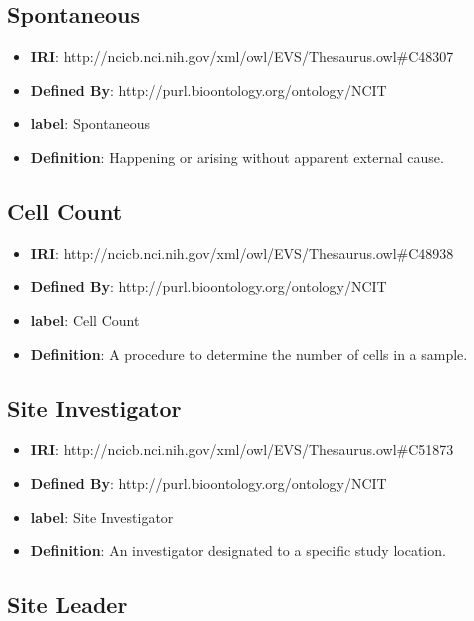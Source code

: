 \documentclass[a4paper,12pt,oneside]{article}
\begin{document}
  \subsection{Spontaneous}

  \begin{itemize}
     \item \textbf{IRI}: http://ncicb.nci.nih.gov/xml/owl/EVS/Thesaurus.owl\#C48307
     \item \textbf{Defined By}: http://purl.bioontology.org/ontology/NCIT
     \item \textbf{label}: Spontaneous
     \item \textbf{Definition}: Happening or arising without apparent external cause.
  \end{itemize}


  \subsection{Cell Count}

  \begin{itemize}
     \item \textbf{IRI}: http://ncicb.nci.nih.gov/xml/owl/EVS/Thesaurus.owl\#C48938
     \item \textbf{Defined By}: http://purl.bioontology.org/ontology/NCIT
     \item \textbf{label}: Cell Count
     \item \textbf{Definition}: A procedure to determine the number of cells in a sample.
  \end{itemize}


  \subsection{Site Investigator}

  \begin{itemize}
     \item \textbf{IRI}: http://ncicb.nci.nih.gov/xml/owl/EVS/Thesaurus.owl\#C51873
     \item \textbf{Defined By}: http://purl.bioontology.org/ontology/NCIT
     \item \textbf{label}: Site Investigator
     \item \textbf{Definition}: An investigator designated to a specific study location.
  \end{itemize}


  \subsection{Site Leader}
\end{document}
